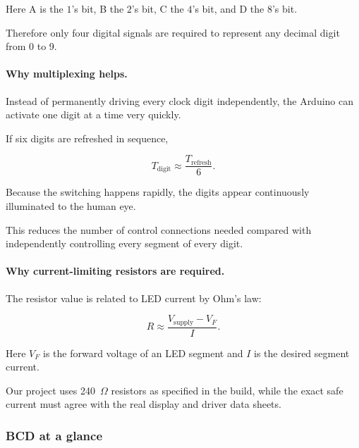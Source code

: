 \documentclass[12pt,letterpaper]{article}
\begin{document}
Here A is the \(1\)'s bit,
B the \(2\)'s bit,
C the \(4\)'s bit,
and D the \(8\)'s bit.

Therefore only four digital signals are required
to represent any decimal digit from 0 to 9.

\paragraph{Why multiplexing helps.}

Instead of permanently driving every clock digit
independently, the Arduino can activate
one digit at a time very quickly.

If six digits are refreshed in sequence,

\[
T_{\text{digit}}
\approx
\frac{T_{\text{refresh}}}{6}.
\]

Because the switching happens rapidly,
the digits appear continuously illuminated
to the human eye.

This reduces the number of control connections
needed compared with independently controlling
every segment of every digit.

\paragraph{Why current-limiting resistors are required.}

The resistor value is related to LED current by
Ohm's law:

\[
R
\approx
\frac{
V_{\text{supply}}-V_F
}{
I
}.
\]

Here \(V_F\) is the forward voltage
of an LED segment and \(I\)
is the desired segment current.

Our project uses 240~$\Omega$ resistors
as specified in the build,
while the exact safe current must agree
with the real display and driver data sheets.

\iffalse
\subsubsection*{BCD at a glance}
\end{document}
